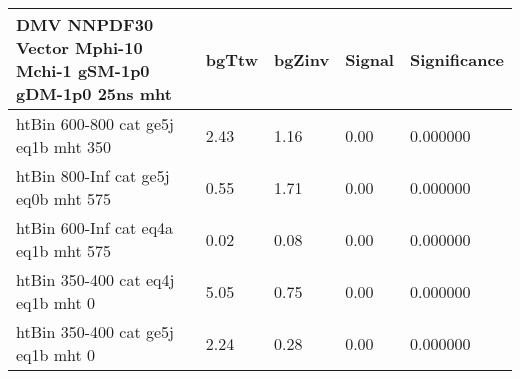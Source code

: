 \begin{tabular}{|l|l|l|l|l|}
\small
   \label{mostSensitiveBins_DMV_NNPDF30_Vector_Mphi-10_Mchi-1_gSM-1p0_gDM-1p0_25ns}
	\textbf{DMV NNPDF30 Vector Mphi-10 Mchi-1 gSM-1p0 gDM-1p0 25ns mht}	 & 	bgTtw	 & 	bgZinv	 & 	Signal &	 Significance \\ 
	\hline
	htBin 600-800 cat ge5j eq1b mht 350 & 	2.43	 & 	1.16	 & 	0.00 	&0.000000 \\ 
	htBin 800-Inf cat ge5j eq0b mht 575 & 	0.55	 & 	1.71	 & 	0.00 	&0.000000 \\ 
	htBin 600-Inf cat eq4a eq1b mht 575 & 	0.02	 & 	0.08	 & 	0.00 	&0.000000 \\ 
	htBin 350-400 cat eq4j eq1b mht 0 & 	5.05	 & 	0.75	 & 	0.00 	&0.000000 \\ 
	htBin 350-400 cat ge5j eq1b mht 0 & 	2.24	 & 	0.28	 & 	0.00 	&0.000000 \\ 
\end{tabular}
